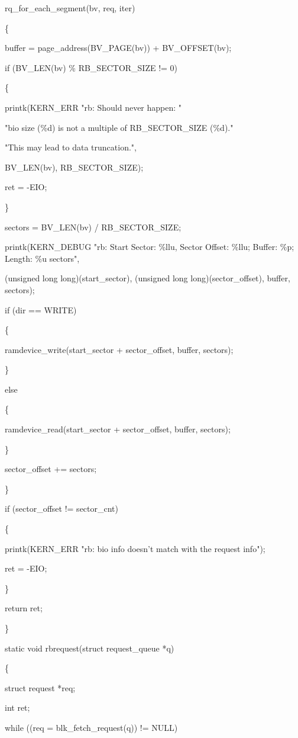 \documentclass[11pt]{article}
\begin{document}
	rq\_for\_each\_segment(bv, req, iter)
	
	\{
	
		buffer = page\_address(BV\_PAGE(bv)) + BV\_OFFSET(bv);
		
		if (BV\_LEN(bv) \% RB\_SECTOR\_SIZE != 0)
		
		\{
		
			printk(KERN\_ERR "rb: Should never happen: "
			
				"bio size (\%d) is not a multiple of RB\_SECTOR\_SIZE (\%d).\n"
				
				"This may lead to data truncation.\n",
				
				BV\_LEN(bv), RB\_SECTOR\_SIZE);
				
			ret = -EIO;
			
		\}
		
		sectors = BV\_LEN(bv) / RB\_SECTOR\_SIZE;
		
		printk(KERN\_DEBUG "rb: Start Sector: \%llu, Sector Offset: \%llu; Buffer: \%p; Length: \%u sectors\n",
		
			(unsigned long long)(start\_sector), (unsigned long long)(sector\_offset), buffer, sectors);
			
		if (dir == WRITE) 
		
		\{
		
			ramdevice\_write(start\_sector + sector\_offset, buffer, sectors);
			
		\}
		
		else 
		
		\{
		
			ramdevice\_read(start\_sector + sector\_offset, buffer, sectors);
			
		\}
		
		sector\_offset += sectors;
		
	\}
	
	if (sector\_offset != sector\_cnt)
	
	\{
	
		printk(KERN\_ERR "rb: bio info doesn't match with the request info");
		
		ret = -EIO;
		
	\}

	return ret;
	
\}
	

static void rbrequest(struct request\_queue *q)

\{

	struct request *req;
	
	int ret;

	while ((req = blk\_fetch\_request(q)) != NULL)
	
\end{document}
